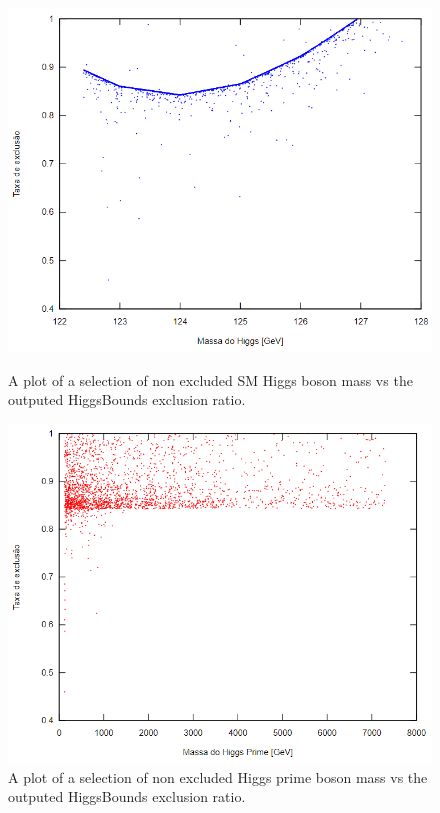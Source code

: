 \documentclass[12pt]{article}
\begin{document}
\begin{figure}[h]
  \includegraphics[width=\linewidth]{h1exc.png}
  \caption{A plot of a selection of non excluded SM Higgs boson mass vs the outputed HiggsBounds exclusion  ratio.}\label{fig:imnotimportant}
\endminipage\hfill
{}%
  \includegraphics[width=\linewidth]{h2exc.png}
  \caption{A plot of a selection of non excluded Higgs prime boson mass vs the outputed HiggsBounds exclusion ratio.}\label{fig:honor}
\endminipage
\end{figure}
\end{document}
